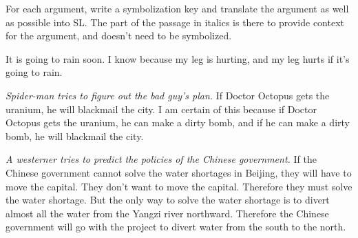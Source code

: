
\problempart
For each argument, write a symbolization key and translate the argument as well as possible into SL. The part of the passage in italics is there to provide context for the argument, and doesn't need to be symbolized.
\begin{earg}
\item It is going to rain soon. I know because my leg is hurting, and my leg hurts if it’s going to rain. 



\item  \emph{Spider-man tries to figure out the bad guy’s plan.} If Doctor Octopus gets the uranium, he will blackmail the city. I am certain of this because if Doctor Octopus gets the uranium, he can make a dirty bomb, and if he can make a dirty bomb, he will blackmail the city.



\item \emph{A westerner tries to predict the policies of the Chinese government.} If the Chinese government cannot solve the water shortages in Beijing, they will have to move the capital. They don’t want to move the capital. Therefore they must solve the water shortage. But the only way to solve the water shortage is to divert almost all the water from the Yangzi river northward. Therefore the Chinese government will go with the project to divert water from the south to the north.       




\end{earg}
